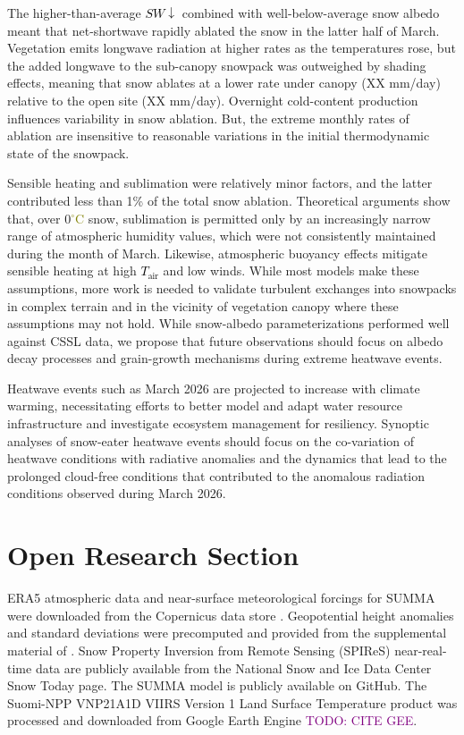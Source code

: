 \documentclass[draft]{agujournal2019}
\newcommand{\todo}[1]{\textcolor{purple}{TODO: #1}}      %
\newcommand{\tair}{\textcolor{black}{$T_{\mathrm{air}}$}\xspace}
\newcommand{\swdn}{\textcolor{black}{$SW\downarrow$}\xspace}
\newcommand{\degrc}{\textcolor{olive}{$^\circ$C}\xspace}
\begin{document}
The higher-than-average \swdn combined with well-below-average snow albedo meant that net-shortwave rapidly ablated the snow in the latter half of March.
Vegetation emits longwave radiation at higher rates as the temperatures rose, but the added longwave to the sub-canopy snowpack was outweighed by shading effects, meaning that snow ablates at a lower rate under canopy (XX mm/day) relative to the open site (XX mm/day).
Overnight cold-content production influences variability in snow ablation.
But, the extreme monthly rates of ablation are insensitive to reasonable variations in the initial thermodynamic state of the snowpack.

%
Sensible heating and sublimation were relatively minor factors, and the latter contributed less than 1\% of the total snow ablation.
Theoretical arguments show that, over 0\degrc snow, sublimation is permitted only by an increasingly narrow range of atmospheric humidity values, which were not consistently maintained during the month of March.
Likewise, atmospheric buoyancy effects mitigate sensible heating at high \tair and low winds.
While most models make these assumptions, more work is needed to validate turbulent exchanges into snowpacks in complex terrain and in the vicinity of vegetation canopy where these assumptions may not hold.
While snow-albedo parameterizations performed well against CSSL data, we propose that future observations should focus on albedo decay processes and grain-growth mechanisms during extreme heatwave events.

Heatwave events such as March 2026 are projected to increase with climate warming, necessitating efforts to better model and adapt water resource infrastructure and investigate ecosystem management for resiliency.
Synoptic analyses of snow-eater heatwave events should focus on the co-variation of heatwave conditions with radiative anomalies and the dynamics that lead to the prolonged cloud-free conditions that contributed to the anomalous radiation conditions observed during March 2026.


\section*{Open Research Section}
ERA5 atmospheric data and near-surface meteorological forcings for SUMMA were downloaded from the Copernicus data store .
Geopotential height anomalies and standard deviations were precomputed and provided from the supplemental material of .
Snow Property Inversion from Remote Sensing (SPIReS) near-real-time data are publicly available from the National Snow and Ice Data Center Snow Today page.
The SUMMA model is publicly available on GitHub.
The Suomi-NPP VNP21A1D VIIRS Version 1 Land Surface Temperature product was processed and downloaded from Google Earth Engine \todo{CITE GEE}.
\end{document}
